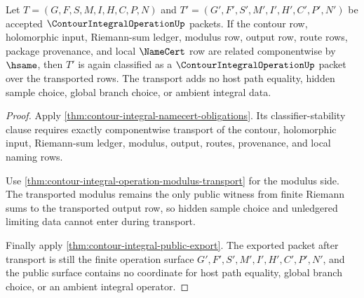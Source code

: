 \begin{theorem}
\label{thm:contour-integral-operation-classifier-stability}
Let $T=(G,F,S,M,I,H,C,P,N)$ and $T'=(G',F',S',M',I',H',C',P',N')$ be accepted $\ContourIntegralOperationUp$ packets. If the contour row, holomorphic input, Riemann-sum ledger, modulus row, output row, route rows, package provenance, and local $\NameCert$ row are related componentwise by $\hsame$, then $T'$ is again classified as a $\ContourIntegralOperationUp$ packet over the transported rows. The transport adds no host path equality, hidden sample choice, global branch choice, or ambient integral data.
\end{theorem}
\begin{proof}
Apply \autoref{thm:contour-integral-namecert-obligations}. Its classifier-stability clause requires exactly componentwise transport of the contour, holomorphic input, Riemann-sum ledger, modulus, output, routes, provenance, and local naming rows.

Use \autoref{thm:contour-integral-operation-modulus-transport} for the modulus side. The transported modulus remains the only public witness from finite Riemann sums to the transported output row, so hidden sample choice and unledgered limiting data cannot enter during transport.

Finally apply \autoref{thm:contour-integral-public-export}. The exported packet after transport is still the finite operation surface $G',F',S',M',I',H',C',P',N'$, and the public surface contains no coordinate for host path equality, global branch choice, or an ambient integral operator.
\end{proof}

